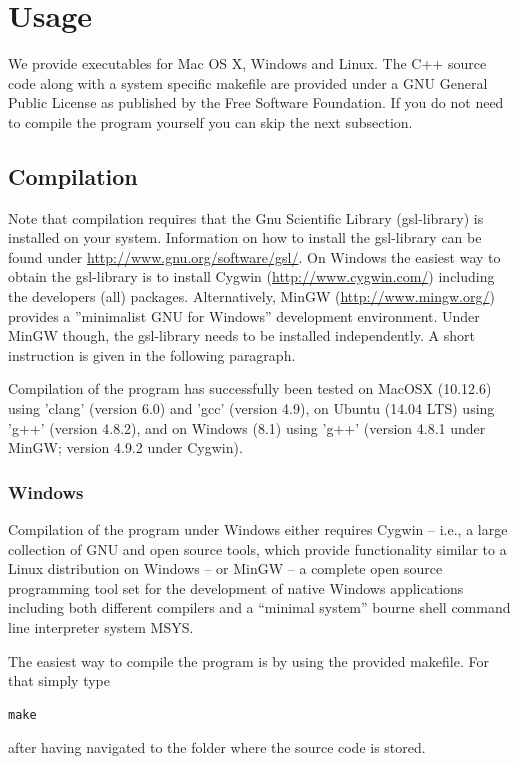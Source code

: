 \documentclass[12pt,a4paper]{scrartcl}
\begin{document}
\section{Usage} 
 
We provide executables for Mac OS X, Windows and Linux. The C++ source code along with a system specific makefile are provided under a GNU General Public License as published by the Free Software Foundation. If you do not need to compile the program yourself you can skip the next subsection.
 
\subsection{Compilation} 

Note that compilation requires that the Gnu Scientific Library (gsl-library) is installed on your system. Information on how to install the gsl-library can be found under \url{http://www.gnu.org/software/gsl/}.
On Windows the easiest way to obtain the gsl-library is to install Cygwin (\url{http://www.cygwin.com/}) including the developers (all) packages. Alternatively, MinGW (\url{http://www.mingw.org/}) provides a ''minimalist GNU for Windows'' development environment. Under MinGW though, the gsl-library needs to be installed independently. A short instruction is given in the following paragraph.

Compilation of the program has successfully been tested on MacOSX (10.12.6) using 'clang' (version 6.0) and 'gcc' (version 4.9), on Ubuntu (14.04 LTS) using 'g++' (version 4.8.2), and on Windows (8.1) using 'g++' (version 4.8.1 under MinGW; version 4.9.2 under Cygwin).

\subsubsection*{Windows}

Compilation of the program under Windows either requires Cygwin -- i.e., a large collection of GNU and open source tools, which provide functionality similar to a Linux distribution on Windows -- or MinGW -- a complete open source programming tool set for the development of native Windows applications including both different compilers and a ``minimal system'' bourne shell command line interpreter system MSYS. 

The easiest way to compile the program is by using the provided makefile. For that simply type 
\begin{lstlisting}
make
\end{lstlisting}
after having navigated to the folder where the source code is stored.
\end{document}
